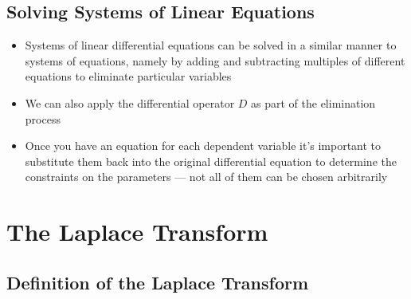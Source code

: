 \documentclass{article}
\begin{document}
\setcounter{subsection}{11}
\subsection{Solving Systems of Linear Equations}

\begin{itemize}
  \item Systems of linear differential equations can be solved in a similar manner to systems of equations, namely by adding and subtracting multiples of different equations to eliminate particular variables

  \item We can also apply the differential operator $D$ as part of the elimination process

  \item Once you have an equation for each dependent variable it's important to substitute them back into the original differential equation to determine the constraints on the parameters — not all of them can be chosen arbitrarily
\end{itemize}

\section{The Laplace Transform}

\subsection{Definition of the Laplace Transform}
\end{document}
